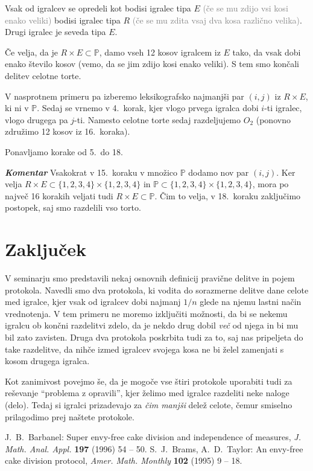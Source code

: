 \documentclass[a4paper,12pt]{article}
\def\P{\mathbb{P}}
\begin{document}
\begin{protokol}
\item Vsak od igralcev se opredeli kot bodisi igralec tipa $E$ \textcolor{gray}{(če se mu zdijo vsi kosi enako veliki)} bodisi igralec tipa $R$ \textcolor{gray}{(če se mu zdita vsaj dva kosa različno velika)}. Drugi igralec je seveda tipa $E$.

\item Če velja, da je  $R \times E \subset \P$, damo vseh 12 kosov igralcem iz $E$ tako, da vsak dobi enako število kosov (vemo, da se jim zdijo kosi enako veliki). S tem smo končali delitev celotne torte.

\item V nasprotnem primeru pa izberemo leksikografsko najmanjši par $(i, j)$ iz $R \times E$, ki ni v $\P$. Sedaj se vrnemo v 4.~korak, kjer vlogo prvega igralca dobi $i$-ti igralec, vlogo drugega pa $j$-ti. Namesto celotne torte sedaj razdeljujemo $O_2$ (ponovno združimo 12 kosov iz 16.~koraka).

\item Ponavljamo korake od 5.~do 18.

 \item [\textbf{\em Komentar}] Vsakokrat v 15.~koraku v množico $\P$ dodamo nov par $(i, j)$. Ker velja $R \times E \subset {\{1, 2, 3, 4\}} \times {\{1, 2, 3, 4\}}$ in $\P \subset {\{1, 2, 3, 4\}} \times {\{1, 2, 3, 4\}}$, mora po največ 16 korakih veljati tudi $R \times E \subset \P$. Čim to velja, v 18.~koraku zaključimo postopek, saj smo razdelili vso torto.
 
 \end{protokol}
 
 \section{Zaključek}
 
 V seminarju smo predstavili nekaj osnovnih definicij pravične delitve in pojem protokola. Navedli smo dva protokola, ki vodita do sorazmerne delitve dane celote med igralce, kjer vsak od igralcev dobi najmanj $1/n$ glede na njemu lastni način vrednotenja. V tem primeru ne moremo izključiti možnosti, da bi se nekemu igralcu ob končni razdelitvi zdelo, da je nekdo drug dobil {\em več} od njega in bi mu bil zato zavisten. Druga dva protokola poskrbita tudi za to, saj nas pripeljeta do take razdelitve, da nihče izmed igralcev svojega kosa ne bi želel zamenjati s kosom drugega igralca.
 
 Kot zanimivost povejmo še, da je mogoče vse štiri protokole uporabiti tudi za reševanje ``problema z opravili'', kjer želimo med igralce razdeliti neke naloge (delo). Tedaj si igralci prizadevajo za {\em čim manjši} delež celote, čemur smiselno prilagodimo prej naštete protokole.


\begin{thebibliography}{5}
J.~B.~Barbanel: Super envy-free cake division and independence of measures, \emph{J. Math. Anal. Appl.} \textbf{197} (1996) 54 -- 50.
S.~J.~Brams, A.~D.~Taylor: An envy-free cake division protocol, \emph{Amer. Math. Monthly} \textbf{102} (1995) 9 -- 18.
\end{thebibliography}
\end{document}
